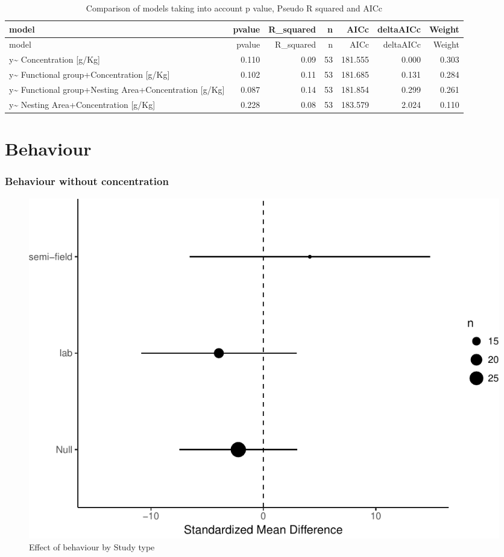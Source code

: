 \documentclass[]{elsarticle} %
\makeatletter
\def\maxwidth{\ifdim\Gin@nat@width>\linewidth\linewidth
\else\Gin@nat@width\fi}
\let\Oldincludegraphics\includegraphics
\renewcommand{\includegraphics}[1]{\Oldincludegraphics[width=\maxwidth]{#1}}
\makeatother
\begin{document}
\begin{longtable}[c]{@{}lrrrrrr@{}}
\caption{Comparison of models taking into account p value, Pseudo R
squared and AICc}\tabularnewline
\toprule
model & pvalue & R\_squared & n & AICc & deltaAICc &
Weight\tabularnewline
\midrule
\endfirsthead
\toprule
model & pvalue & R\_squared & n & AICc & deltaAICc &
Weight\tabularnewline
\midrule
\endhead
y\textasciitilde{} Concentration {[}g/Kg{]} & 0.110 & 0.09 & 53 &
181.555 & 0.000 & 0.303\tabularnewline
y\textasciitilde{} Functional group+Concentration {[}g/Kg{]} & 0.102 &
0.11 & 53 & 181.685 & 0.131 & 0.284\tabularnewline
y\textasciitilde{} Functional group+Nesting Area+Concentration
{[}g/Kg{]} & 0.087 & 0.14 & 53 & 181.854 & 0.299 & 0.261\tabularnewline
y\textasciitilde{} Nesting Area+Concentration {[}g/Kg{]} & 0.228 & 0.08
& 53 & 183.579 & 2.024 & 0.110\tabularnewline
\bottomrule
\end{longtable}

\section{Behaviour}\label{behaviour}

\subsubsection{Behaviour without
concentration}\label{behaviour-without-concentration}

\begin{figure}[htbp]
\centering
\includegraphics{MetanalysisNeonics_files/figure-latex/unnamed-chunk-15-1.pdf}
\caption{Effect of behaviour by Study type}
\end{figure}
\end{document}
